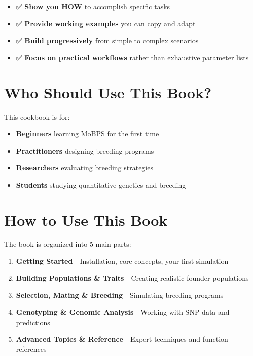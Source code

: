 \documentclass[
  letterpaper,
]{book}
\providecommand{\tightlist}{%
  \setlength{\itemsep}{0pt}\setlength{\parskip}{0pt}}
\begin{document}
\begin{itemize}
\tightlist
\item
  ✅ \textbf{Show you HOW} to accomplish specific tasks
\item
  ✅ \textbf{Provide working examples} you can copy and adapt
\item
  ✅ \textbf{Build progressively} from simple to complex scenarios
\item
  ✅ \textbf{Focus on practical workflows} rather than exhaustive
  parameter lists
\end{itemize}

\section*{Who Should Use This Book?}\label{who-should-use-this-book}


This cookbook is for:

\begin{itemize}
\tightlist
\item
  \textbf{Beginners} learning MoBPS for the first time
\item
  \textbf{Practitioners} designing breeding programs
\item
  \textbf{Researchers} evaluating breeding strategies
\item
  \textbf{Students} studying quantitative genetics and breeding
\end{itemize}

\section*{How to Use This Book}\label{how-to-use-this-book}


The book is organized into 5 main parts:

\begin{enumerate}
\def\labelenumi{\arabic{enumi}.}
\tightlist
\item
  \textbf{Getting Started} - Installation, core concepts, your first
  simulation
\item
  \textbf{Building Populations \& Traits} - Creating realistic founder
  populations
\item
  \textbf{Selection, Mating \& Breeding} - Simulating breeding programs
\item
  \textbf{Genotyping \& Genomic Analysis} - Working with SNP data and
  predictions
\item
  \textbf{Advanced Topics \& Reference} - Expert techniques and function
  references
\end{enumerate}
\end{document}
